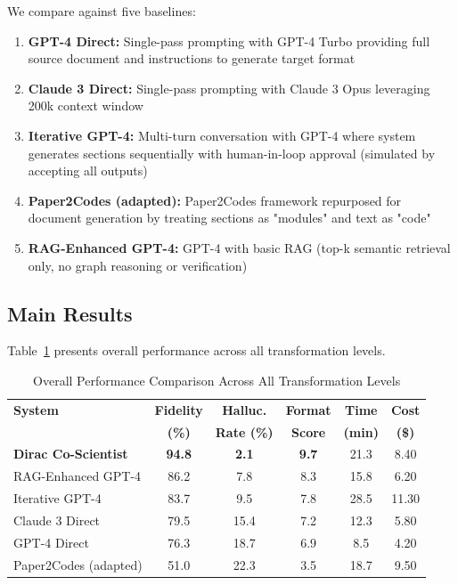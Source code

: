 \documentclass{ieeeaccess}
\begin{document}
We compare against five baselines:

\begin{enumerate}
\item \textbf{GPT-4 Direct:} Single-pass prompting with GPT-4 Turbo providing full source document and instructions to generate target format

\item \textbf{Claude 3 Direct:} Single-pass prompting with Claude 3 Opus leveraging 200k context window

\item \textbf{Iterative GPT-4:} Multi-turn conversation with GPT-4 where system generates sections sequentially with human-in-loop approval (simulated by accepting all outputs)

\item \textbf{Paper2Codes (adapted):} Paper2Codes framework repurposed for document generation by treating sections as "modules" and text as "code"

\item \textbf{RAG-Enhanced GPT-4:} GPT-4 with basic RAG (top-k semantic retrieval only, no graph reasoning or verification)
\end{enumerate}

\subsection{Main Results}

Table~\ref{tab:main-results} presents overall performance across all transformation levels.

\begin{table}[!t]
\caption{Overall Performance Comparison Across All Transformation Levels}
\label{tab:main-results}
\centering
\renewcommand{\arraystretch}{1.25}
\small
\begin{tabular}{@{}lccccc@{}}
\toprule
\textbf{System} & \textbf{Fidelity} & \textbf{Halluc.} & \textbf{Format} & \textbf{Time} & \textbf{Cost} \\
 & \textbf{(\%)} & \textbf{Rate (\%)} & \textbf{Score} & \textbf{(min)} & \textbf{(\$)} \\
\midrule
\textbf{Dirac Co-Scientist} & \textbf{94.8} & \textbf{2.1} & \textbf{9.7} & 21.3 & 8.40 \\
RAG-Enhanced GPT-4 & 86.2 & 7.8 & 8.3 & 15.8 & 6.20 \\
Iterative GPT-4 & 83.7 & 9.5 & 7.8 & 28.5 & 11.30 \\
Claude 3 Direct & 79.5 & 15.4 & 7.2 & 12.3 & 5.80 \\
GPT-4 Direct & 76.3 & 18.7 & 6.9 & 8.5 & 4.20 \\
Paper2Codes (adapted) & 51.0 & 22.3 & 3.5 & 18.7 & 9.50 \\
\bottomrule
\end{tabular}
\normalsize
\end{table}
\end{document}

